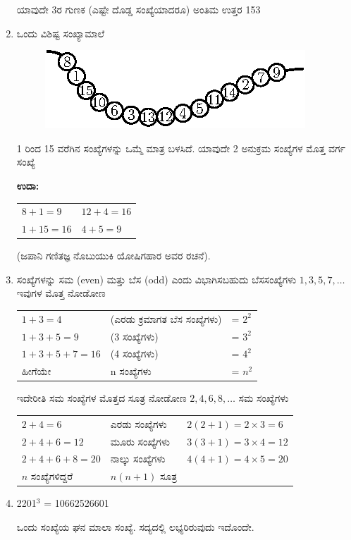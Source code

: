 \begin{enumerate}
ಯಾವುದೇ 3ರ ಗುಣಕ (ಎಷ್ಟೇ ದೊಡ್ಡ ಸಂಖ್ಯೆಯಾದರೂ) ಅಂತಿಮ ಉತ್ತರ 153

\item ಒಂದು ವಿಶಿಷ್ಟ ಸಂಖ್ಯಾಮಾಲೆ
\begin{figure}[H]
\centering
\includegraphics{images/chap1/q28.eps}
\end{figure}

1 ರಿಂದ 15 ವರೆಗಿನ ಸಂಖ್ಯೆಗಳನ್ನು ಒಮ್ಮೆ ಮಾತ್ರ ಬಳಸಿದೆ. ಯಾವುದೇ 2 ಅನುಕ್ರಮ ಸಂಖ್ಯೆಗಳ ಮೊತ್ತ ವರ್ಗ ಸಂಖ್ಯೆ

{\bf ಉದಾ:}
\begin{tabular}[t]{ll}
$8 + 1 = 9$ & $12 + 4 = 16$\\
$1 + 15 = 16$ & $4 + 5 = 9$
\end{tabular}

\hfill (ಜಪಾನಿ ಗಣಿತಜ್ಞ ನೊಬುಯುಕಿ ಯೋಷಿಗಹಾರ ಅವರ ರಚನೆ).

\item ಸಂಖ್ಯೆಗಳನ್ನು ಸಮ (even) ಮತ್ತು ಬೆಸ (odd) ಎಂದು ವಿಭಾಗಿಸಬಹುದು ಬೆಸ\break ಸಂಖ್ಯೆಗಳು $1, 3, 5, 7, \ldots$ ಇವುಗಳ ಮೊತ್ತ ನೋಡೋಣ

{\fontsize{11pt}{13pt}\selectfont
\begin{tabular}{lll}
$1 + 3 = 4$ &(ಎರಡು ಕ್ರಮಾಗತ ಬೆಸ ಸಂಖ್ಯೆಗಳು) & = $2^{2}$\\
$1 + 3 + 5 = 9$ &(3 ಸಂಖ್ಯೆಗಳು) & = $3^{2}$\\
$1 + 3 + 5 + 7 = 16$ &(4 ಸಂಖ್ಯೆಗಳು) & = $4^{2}$\\
ಹೀಗೆಯೇ & n ಸಂಖ್ಯೆಗಳು & = $n^{2}$
\end{tabular}}\relax

ಇದೇರೀತಿ ಸಮ ಸಂಖ್ಯೆಗಳ ಮೊತ್ತದ ಸೂತ್ರ ನೋಡೋಣ $2, 4, 6, 8, \ldots$ ಸಮ ಸಂಖ್ಯೆಗಳು

{\fontsize{11pt}{13pt}\selectfont
\begin{tabular}{lll}
$2 + 4= 6$ & ಎರಡು ಸಂಖ್ಯೆಗಳು & $2(2 + 1) = 2 \times 3 = 6$\\
$2 + 4 + 6 = 12$ & ಮೂರು ಸಂಖ್ಯೆಗಳು & $3(3 + 1) = 3 \times 4 = 12$\\
$2 + 4 + 6 + 8 = 20$ &ನಾಲ್ಕು ಸಂಖ್ಯೆಗಳು & $4(4 + 1) = 4 \times 5 = 20$\\
$n$ ಸಂಖ್ಯೆಗಳಿದ್ದರೆ & $n(n + 1)$ ಸೂತ್ರ &
\end{tabular}}\relax

\item 2201$^{3}$ = 10662526601

ಒಂದು ಸಂಖ್ಯೆಯ ಘನ ಮಾಲಾ ಸಂಖ್ಯೆ. ಸದ್ಯದಲ್ಲಿ ಲಭ್ಯರಿರುವುದು ಇದೊಂದೇ.
\end{enumerate}


